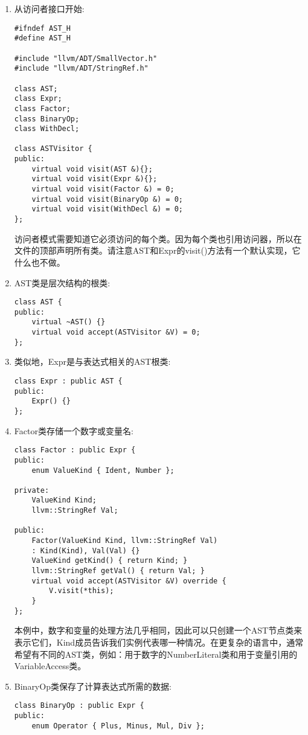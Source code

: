 \begin{enumerate}
\item 从访问者接口开始:
\begin{lstlisting}[caption={}]
#ifndef AST_H
#define AST_H

#include "llvm/ADT/SmallVector.h"
#include "llvm/ADT/StringRef.h"

class AST;
class Expr;
class Factor;
class BinaryOp;
class WithDecl;

class ASTVisitor {
public:
	virtual void visit(AST &){};
	virtual void visit(Expr &){};
	virtual void visit(Factor &) = 0;
	virtual void visit(BinaryOp &) = 0;
	virtual void visit(WithDecl &) = 0;
};
\end{lstlisting}
访问者模式需要知道它必须访问的每个类。因为每个类也引用访问器，所以在文件的顶部声明所有类。请注意AST和Expr的visit()方法有一个默认实现，它什么也不做。

\item AST类是层次结构的根类:
\begin{lstlisting}[caption={}]
class AST {
public:
	virtual ~AST() {}
	virtual void accept(ASTVisitor &V) = 0;
};
\end{lstlisting}

\item 类似地，Expr是与表达式相关的AST根类:
\begin{lstlisting}[caption={}]
class Expr : public AST {
public:
	Expr() {}
};
\end{lstlisting}

\item Factor类存储一个数字或变量名:
\begin{lstlisting}[caption={}]
class Factor : public Expr {
public:
	enum ValueKind { Ident, Number };
	
private:
	ValueKind Kind;
	llvm::StringRef Val;
	
public:
	Factor(ValueKind Kind, llvm::StringRef Val)
	: Kind(Kind), Val(Val) {}
	ValueKind getKind() { return Kind; }
	llvm::StringRef getVal() { return Val; }
	virtual void accept(ASTVisitor &V) override {
		V.visit(*this);
	}
};
\end{lstlisting}
本例中，数字和变量的处理方法几乎相同，因此可以只创建一个AST节点类来表示它们，Kind成员告诉我们实例代表哪一种情况。在更复杂的语言中，通常希望有不同的AST类，例如：用于数字的NumberLiteral类和用于变量引用的VariableAccess类。

\item BinaryOp类保存了计算表达式所需的数据:
\begin{lstlisting}[caption={}]
class BinaryOp : public Expr {
public:
	enum Operator { Plus, Minus, Mul, Div };
	

\end{lstlisting}
\end{enumerate}
